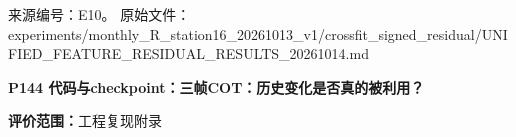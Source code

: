 \documentclass[UTF8,a4paper,landscape,10pt]{ctexart}
\begin{document}
\vfill{\scriptsize\color{muted} 来源编号：E10。 原始文件：experiments/\allowbreak{}monthly\_\allowbreak{}R\_\allowbreak{}station16\_\allowbreak{}20261013\_\allowbreak{}v1/\allowbreak{}crossfit\_\allowbreak{}signed\_\allowbreak{}residual/\allowbreak{}UNIFIED\_\allowbreak{}FEATURE\_\allowbreak{}RESIDUAL\_\allowbreak{}RESULTS\_\allowbreak{}20261014.md}\par
\clearpage
{\large\bfseries\color{ink} P144  代码与checkpoint：三帧COT：历史变化是否真的被利用？}\par
{}\par
{\small\color{muted}\textbf{评价范围：}工程复现附录}\par\vspace{3mm}
\end{document}
